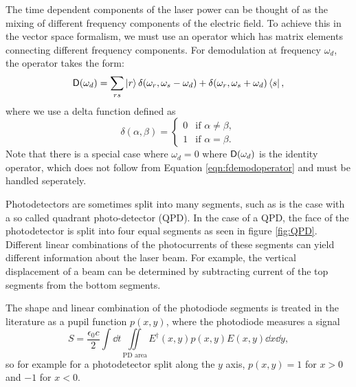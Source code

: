 The time dependent components of the laser power can be thought of as the mixing of different frequency components of the electric field. %
To achieve this in the vector space formalism, we must use an operator which has matrix elements connecting different frequency components. %
For demodulation at frequency $\omega_d$, the  operator takes the form: 
\begin{equation}
\label{eqn:fdemodoperator}
\mathsf{D}(\omega_d) = \sum_{rs} \left| r \right> \delta(\omega_r,\omega_s-\omega_d) + \delta(\omega_r,\omega_s+\omega_d)\left< s \right|,
\end{equation}
where we use a delta function defined as
\begin{equation}
\delta(\alpha,\beta) = 
\begin{cases}
0 & \text{if $\alpha \neq \beta$}, \\
1 & \text{if $\alpha = \beta$}.
\end{cases}
\end{equation}
Note that there is a special case where $\omega_d=0$ where $\mathsf{D}(\omega_d)$ is the identity operator, which does not follow from Equation \ref{eqn:fdemodoperator} and must be handled seperately.

Photodetectors are sometimes split into many segments, such as is the case with a so called quadrant photo-detector (QPD). %
In the case of a QPD, the face of the photodetector is split into four equal segments as seen in figure \ref{fig:QPD}. %
 Different linear combinations of the photocurrents of these segments can yield different information about the laser beam. %
For example, the vertical displacement of a beam can be determined by subtracting current of the top segments from the bottom segments.

The shape and linear combination of the photodiode segments is treated in the literature\cite{Hefetz:97} as a pupil function $p(x,y)$,  where the photodiode measures a signal
\begin{equation}
S=\frac{\epsilon_0 c}{2}\int \! %
\! %
\dd t \iint\limits_{\text{PD area}}E^\dagger(x,y)p(x,y)E(x,y)\dd x \dd y,
\end{equation}
so for example for a photodetector split along the $y$ axis, $p(x,y)=1$ for $x>0$ and $-1$ for $x<0$.


